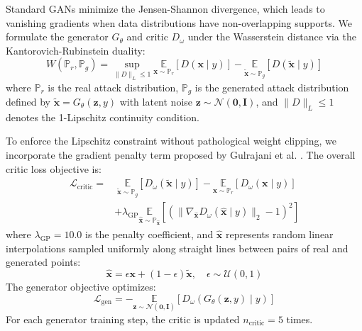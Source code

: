 \documentclass[journal]{IEEEtran}
\begin{document}
Standard GANs minimize the Jensen-Shannon divergence, which leads to vanishing gradients when data distributions have non-overlapping supports. We formulate the generator $G_\theta$ and critic $D_\omega$ under the Wasserstein distance via the Kantorovich-Rubinstein duality:
\begin{equation}
W(\mathbb{P}_r, \mathbb{P}_g) = \sup_{\|D\|_L \le 1} \underset{\mathbf{x} \sim \mathbb{P}_r}{\mathbb{E}}[D(\mathbf{x} \mid y)] - \underset{\tilde{\mathbf{x}} \sim \mathbb{P}_g}{\mathbb{E}}[D(\tilde{\mathbf{x}} \mid y)]
\label{eq:wasserstein}
\end{equation}
where $\mathbb{P}_r$ is the real attack distribution, $\mathbb{P}_g$ is the generated attack distribution defined by $\tilde{\mathbf{x}} = G_\theta(\mathbf{z}, y)$ with latent noise $\mathbf{z} \sim \mathcal{N}(\mathbf{0}, \mathbf{I})$, and $\|D\|_L \le 1$ denotes the 1-Lipschitz continuity condition.

To enforce the Lipschitz constraint without pathological weight clipping, we incorporate the gradient penalty term proposed by Gulrajani et al. \cite{gulrajani2017improved}. The overall critic loss objective is:
\begin{equation}
\begin{aligned}
\mathcal{L}_{\text{critic}} = & \;\underset{\tilde{\mathbf{x}} \sim \mathbb{P}_g}{\mathbb{E}}[D_\omega(\tilde{\mathbf{x}} \mid y)] - \underset{\mathbf{x} \sim \mathbb{P}_r}{\mathbb{E}}[D_\omega(\mathbf{x} \mid y)] \\
& + \lambda_{\text{GP}} \underset{\hat{\mathbf{x}} \sim \mathbb{P}_{\hat{\mathbf{x}}}}{\mathbb{E}} \left[ \left( \|\nabla_{\hat{\mathbf{x}}} D_\omega(\hat{\mathbf{x}} \mid y)\|_2 - 1 \right)^2 \right]
\end{aligned}
\label{eq:critic_loss}
\end{equation}
where $\lambda_{\text{GP}} = 10.0$ is the penalty coefficient, and $\hat{\mathbf{x}}$ represents random linear interpolations sampled uniformly along straight lines between pairs of real and generated points:
\begin{equation}
\hat{\mathbf{x}} = \epsilon \mathbf{x} + (1 - \epsilon)\tilde{\mathbf{x}}, \quad \epsilon \sim \mathcal{U}(0, 1)
\label{eq:interpolation}
\end{equation}
The generator objective optimizes:
\begin{equation}
\mathcal{L}_{\text{gen}} = -\underset{\mathbf{z} \sim \mathcal{N}(\mathbf{0}, \mathbf{I})}{\mathbb{E}} [D_\omega(G_\theta(\mathbf{z}, y) \mid y)]
\label{eq:gen_loss}
\end{equation}
For each generator training step, the critic is updated $n_{\text{critic}} = 5$ times. 
\end{document}
